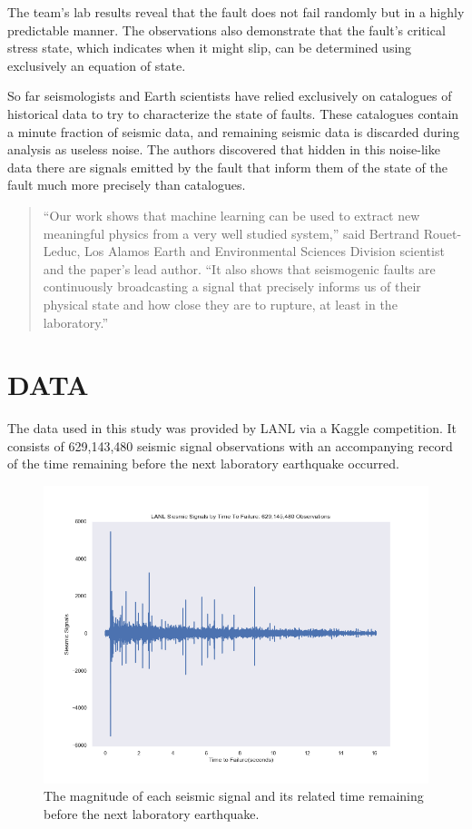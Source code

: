 \documentclass[]{llncs}
\begin{document}
The team’s lab results reveal that the fault does not fail randomly but in a highly predictable manner. The observations also demonstrate that the fault’s critical stress state, which indicates when it might slip, can be determined using exclusively an equation of state.\cite{LANLNews}\par

So far seismologists and Earth scientists have relied exclusively on catalogues of historical data to try to characterize the state of faults. These catalogues contain a minute fraction of seismic data, and remaining seismic data is discarded during analysis as useless noise. The authors discovered that hidden in this noise-like data there are signals emitted by the fault that inform them of the state of the fault much more precisely than catalogues.\cite{LANLNews}\par
\begin{quote}
“Our work shows that machine learning can be used to extract new meaningful physics from a very well studied system,” said Bertrand Rouet-Leduc, Los Alamos Earth and Environmental Sciences Division scientist and the paper’s lead author. “It also shows that seismogenic faults are continuously broadcasting a signal that precisely informs us of their physical state and how close they are to rupture, at least in the laboratory.”
\end{quote}

\section{DATA} The data used in this study was provided by LANL via a Kaggle competition\cite{kaggle}. It consists of 629,143,480 seismic signal observations with an accompanying record of the time remaining before the next laboratory earthquake occurred.\par
\begin{figure}[h]
	\centering
	\includegraphics[width=0.7\linewidth]{../GPUProject/allDataDefaultPlot}
	\caption{The magnitude of each seismic signal and its related time remaining before the next laboratory earthquake.}
	\label{fig:alldatadefaultplot}
\end{figure}
\end{document}
